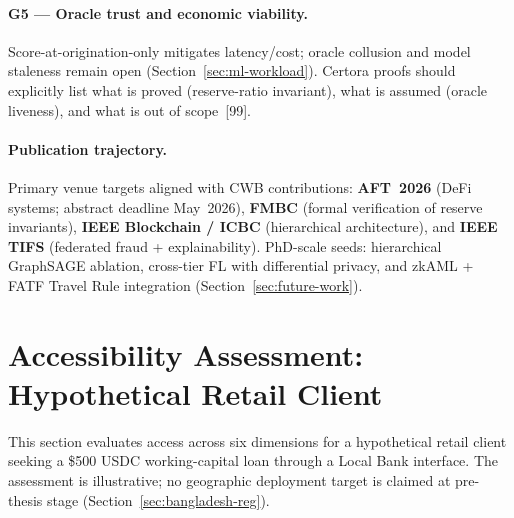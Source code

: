 \documentclass[12pt, a4paper]{report}
\begin{document}
\paragraph{G5 --- Oracle trust and economic viability.}
Score-at-origination-only mitigates latency/cost; oracle collusion and model staleness remain open (Section~\ref{sec:ml-workload}). Certora proofs should explicitly list what is proved (reserve-ratio invariant), what is assumed (oracle liveness), and what is out of scope~[99].

\paragraph{Publication trajectory.}
Primary venue targets aligned with CWB contributions: \textbf{AFT~2026} (DeFi systems; abstract deadline May~2026), \textbf{FMBC} (formal verification of reserve invariants), \textbf{IEEE Blockchain / ICBC} (hierarchical architecture), and \textbf{IEEE TIFS} (federated fraud + explainability). PhD-scale seeds: hierarchical GraphSAGE ablation, cross-tier FL with differential privacy, and zkAML + FATF Travel Rule integration (Section~\ref{sec:future-work}).

\section{Accessibility Assessment: Hypothetical Retail Client}

This section evaluates access across six dimensions for a hypothetical retail client seeking a \$500 USDC working-capital loan through a Local Bank interface. The assessment is illustrative; no geographic deployment target is claimed at pre-thesis stage (Section~\ref{sec:bangladesh-reg}).
\end{document}
